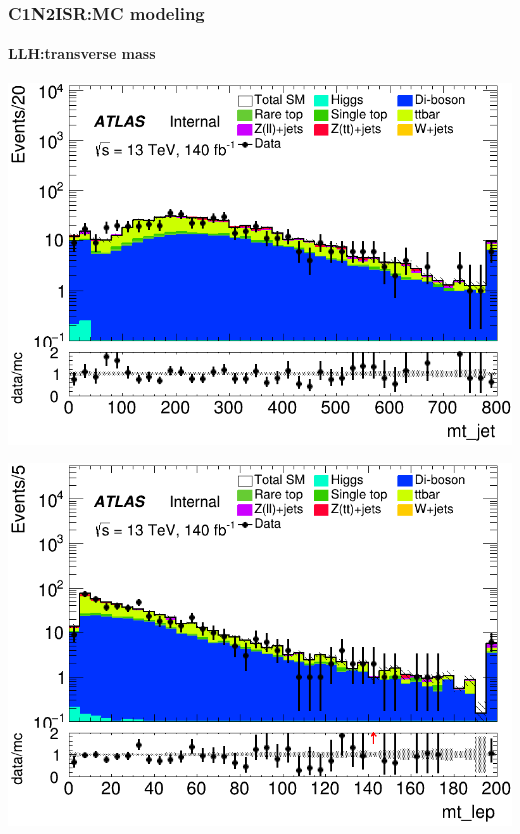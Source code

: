 \documentclass[usenames,dvipsnames]{beamer}
\begin{document}
\begin{frame}
\frametitle{C1N2ISR:MC modeling}
\framesubtitle{LLH:\quad transverse mass}
    \begin{minipage}{0.32\textwidth}
        \centering
        \includegraphics[width=\textwidth]{graphics/LLH_met/LLH_met_mt_jet.png}
    \end{minipage}
    \hfill
    \begin{minipage}{0.32\textwidth}
        \centering
        \includegraphics[width=\textwidth]{graphics/LLH_met/LLH_met_mt_lep.png}
    \end{minipage}
    \hfill
    \begin{minipage}{0.32\textwidth}
        \centering

\end{minipage}
\end{frame}
\end{document}

